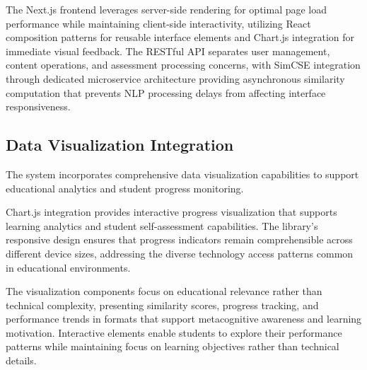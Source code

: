 {The Next.js frontend leverages server-side rendering for optimal page load performance while maintaining client-side interactivity, utilizing React composition patterns for reusable interface elements and Chart.js integration for immediate visual feedback. The RESTful API separates user management, content operations, and assessment processing concerns, with SimCSE integration through dedicated microservice architecture providing asynchronous similarity computation that prevents NLP processing delays from affecting interface responsiveness.


\subsection{Data Visualization Integration}

The system incorporates comprehensive data visualization capabilities to support educational analytics and student progress monitoring.

Chart.js integration provides interactive progress visualization that supports learning analytics and student self-assessment capabilities. The library's responsive design ensures that progress indicators remain comprehensible across different device sizes, addressing the diverse technology access patterns common in educational environments.

The visualization components focus on educational relevance rather than technical complexity, presenting similarity scores, progress tracking, and performance trends in formats that support metacognitive awareness and learning motivation. Interactive elements enable students to explore their performance patterns while maintaining focus on learning objectives rather than technical details.







}
